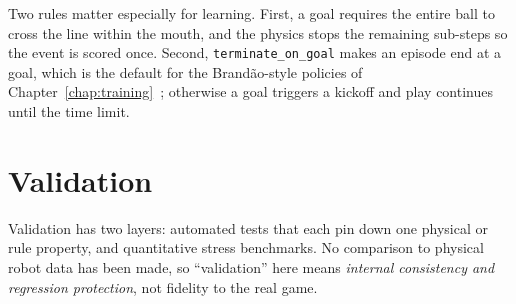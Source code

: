Two rules matter especially for learning.  First, a goal requires the entire ball to cross
the line within the mouth, and the physics stops the remaining sub-steps so the event is scored once.
Second, \texttt{terminate\_on\_goal} makes an episode end at a goal, which is the default for the Brand\~ao-style policies of
Chapter~\ref{chap:training}~\cite{brandao2022}; otherwise a goal triggers a kickoff and play continues until
the time limit.

\section{Validation}
\label{sec:sim_validation}

Validation has two layers: automated tests that each pin down one physical or rule property, and
quantitative stress benchmarks.  No comparison to physical robot data has been made, so ``validation''
here means \emph{internal consistency and regression protection}, not fidelity to the real game.

